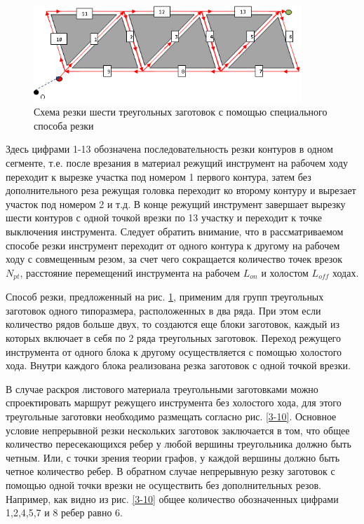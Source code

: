 \documentclass[12pt,twoside]{report}
\begin{document}
\begin{figure}
  \begin{center}
  \includegraphics[width=0.9\textwidth]{6-1.png}
  \caption{Схема резки шести треугольных заготовок с помощью специального способа резки}
  \label{6-1}
  \end{center}
\end{figure}

Здесь цифрами 1-13 обозначена последовательность
резки контуров в одном сегменте,
т.е. после врезания в материал режущий инструмент
на рабочем ходу переходит к вырезке участка под номером 1
первого контура,
затем без дополнительного реза режущая головка
переходит ко второму контуру и вырезает участок под номером 2 и т.д.
В конце режущий инструмент завершает вырезку шести контуров
с одной точкой врезки по 13 участку и переходит к
точке выключения инструмента.
Следует обратить внимание, что в рассматриваемом способе
резки инструмент переходит от одного контура к другому
на рабочем ходу с совмещенным резом,
за счет чего сокращается количество точек врезок $N_{pt}$,
расстояние перемещений инструмента на рабочем $L_{on}$
и холостом  $L_{off}$ ходах.

Способ резки, предложенный на рис. \ref{6-1},
применим для групп треугольных заготовок одного типоразмера,
расположенных в два ряда.
При этом если количество рядов больше двух,
то создаются еще блоки заготовок,
каждый из которых включает в себя по 2 ряда треугольных заготовок.
Переход режущего инструмента от одного блока к другому
осуществляется с помощью холостого хода.
Внутри каждого блока реализована резка заготовок с одной точкой врезки.

В случае раскроя листового материала треугольными
заготовками можно спроектировать маршрут режущего
инструмента без холостого хода,
для этого треугольные заготовки необходимо
размещать согласно рис. \ref{3-10}.
Основное условие непрерывной резки нескольких
заготовок заключается в том,
что общее количество пересекающихся ребер у
любой вершины треугольника должно быть четным.
Или, с точки зрения теории графов,
у каждой вершины
должно быть четное количество ребер.
В обратном случае непрерывную резку заготовок
с помощью одной точки врезки не осуществить
без дополнительных резов.
Например, как видно из рис. \ref{3-10}
общее количество обозначенных цифрами 1,2,4,5,7 и 8 ребер равно 6.
\end{document}
